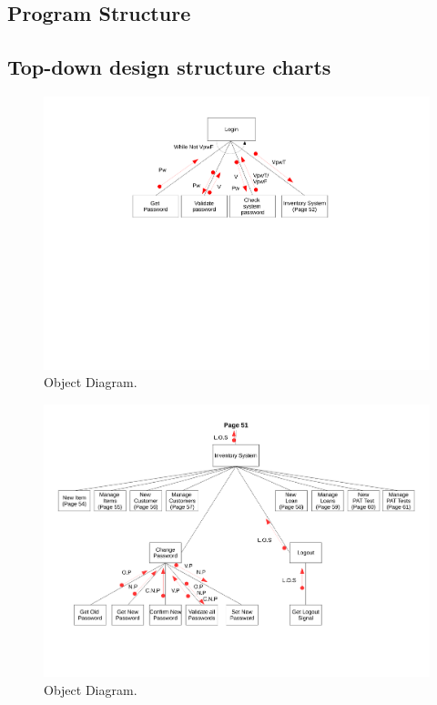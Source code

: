 \begin{landscape}

\section{Program Structure}

\subsection{Top-down design structure charts}

\begin{figure}[H]
    \begin{center}
    \includegraphics[width=500px]{./Design/top_down_design/Top_down_design.pdf}
    \caption{Object Diagram.} \label{fig:object_diagram}
    \end{center}
\end{figure}

\newpage

\begin{figure}[H]
    \begin{center}
    \includegraphics[width=500px]{./Design/top_down_design/inventory_system.pdf}
    \caption{Object Diagram.} \label{fig:object_diagram}
    \end{center}
\end{figure}


\end{landscape}
